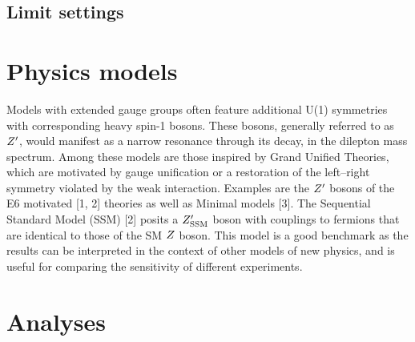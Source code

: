 \documentclass{cernrep}
\begin{document}
\clearpage
\newpage

\subsection{Limit settings}


\section{Physics models}

Models with extended gauge groups often feature additional U(1) symmetries with corresponding heavy spin-1 bosons. These bosons, generally referred to as $Z^{\prime}$, would manifest as a narrow resonance through
its  decay,  in  the  dilepton  mass  spectrum.   
Among  these  models  are  those  inspired  by  Grand  Unified Theories, which are 
motivated by gauge unification or a restoration of the left–right symmetry violated
by the weak interaction. Examples are the $Z^{\prime}$
bosons of the E6 motivated [1, 2] theories as well as Minimal models [3].  
The Sequential Standard Model (SSM) [2] posits a $Z^{\prime}_{\mathrm{SSM}}$ boson with couplings to fermions
that are identical to those of the SM $Z$ boson. This model is a good benchmark as the 
results can be interpreted in the context of other models of new physics, and is useful 
for comparing the sensitivity of different experiments.



\section{Analyses}
\end{document}
